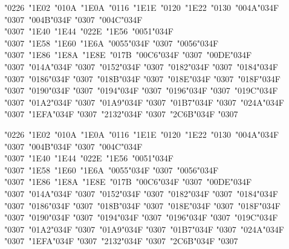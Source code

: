 \documentclass[10pt]{article}
\newcommand{\cgj}{\char"034F }
\begin{document}
\par\noindent{}\parbox[t]{\dimexpr\linewidth-2.4cm}{\PropR\fontsize{18}{30}\selectfont\raggedright {\color{pre}\char"0226}\ {\color{pre}\char"1E02}\ {\color{pre}\char"010A}\ {\color{pre}\char"1E0A}\ {\color{pre}\char"0116}\ {\color{pre}\char"1E1E}\ {\color{pre}\char"0120}\ {\color{pre}\char"1E22}\ {\color{pre}\char"0130}\ \char"004A\cgj\char"0307\ \char"004B\cgj\char"0307\ \char"004C\cgj\char"0307\ {\color{pre}\char"1E40}\ {\color{pre}\char"1E44}\ {\color{pre}\char"022E}\ {\color{pre}\char"1E56}\ \char"0051\cgj\char"0307\ {\color{pre}\char"1E58}\ {\color{pre}\char"1E60}\ {\color{pre}\char"1E6A}\ \char"0055\cgj\char"0307\ \char"0056\cgj\char"0307\ {\color{pre}\char"1E86}\ {\color{pre}\char"1E8A}\ {\color{pre}\char"1E8E}\ {\color{pre}\char"017B}\ \char"00C6\cgj\char"0307\ \char"00DE\cgj\char"0307\ \char"014A\cgj\char"0307\ \char"0152\cgj\char"0307\ \char"0182\cgj\char"0307\ \char"0184\cgj\char"0307\ \char"0186\cgj\char"0307\ \char"018B\cgj\char"0307\ \char"018E\cgj\char"0307\ \char"018F\cgj\char"0307\ \char"0190\cgj\char"0307\ \char"0194\cgj\char"0307\ \char"0196\cgj\char"0307\ \char"019C\cgj\char"0307\ \char"01A2\cgj\char"0307\ \char"01A9\cgj\char"0307\ \char"01B7\cgj\char"0307\ \char"024A\cgj\char"0307\ \char"1EFA\cgj\char"0307\ \char"2132\cgj\char"0307\ \char"2C6B\cgj\char"0307}\par
\par\noindent{}\parbox[t]{\dimexpr\linewidth-2.4cm}{\PropI\fontsize{18}{30}\selectfont\raggedright {\color{pre}\char"0226}\ {\color{pre}\char"1E02}\ {\color{pre}\char"010A}\ {\color{pre}\char"1E0A}\ {\color{pre}\char"0116}\ {\color{pre}\char"1E1E}\ {\color{pre}\char"0120}\ {\color{pre}\char"1E22}\ {\color{pre}\char"0130}\ \char"004A\cgj\char"0307\ \char"004B\cgj\char"0307\ \char"004C\cgj\char"0307\ {\color{pre}\char"1E40}\ {\color{pre}\char"1E44}\ {\color{pre}\char"022E}\ {\color{pre}\char"1E56}\ \char"0051\cgj\char"0307\ {\color{pre}\char"1E58}\ {\color{pre}\char"1E60}\ {\color{pre}\char"1E6A}\ \char"0055\cgj\char"0307\ \char"0056\cgj\char"0307\ {\color{pre}\char"1E86}\ {\color{pre}\char"1E8A}\ {\color{pre}\char"1E8E}\ {\color{pre}\char"017B}\ \char"00C6\cgj\char"0307\ \char"00DE\cgj\char"0307\ \char"014A\cgj\char"0307\ \char"0152\cgj\char"0307\ \char"0182\cgj\char"0307\ \char"0184\cgj\char"0307\ \char"0186\cgj\char"0307\ \char"018B\cgj\char"0307\ \char"018E\cgj\char"0307\ \char"018F\cgj\char"0307\ \char"0190\cgj\char"0307\ \char"0194\cgj\char"0307\ \char"0196\cgj\char"0307\ \char"019C\cgj\char"0307\ \char"01A2\cgj\char"0307\ \char"01A9\cgj\char"0307\ \char"01B7\cgj\char"0307\ \char"024A\cgj\char"0307\ \char"1EFA\cgj\char"0307\ \char"2132\cgj\char"0307\ \char"2C6B\cgj\char"0307}\par
\end{document}
